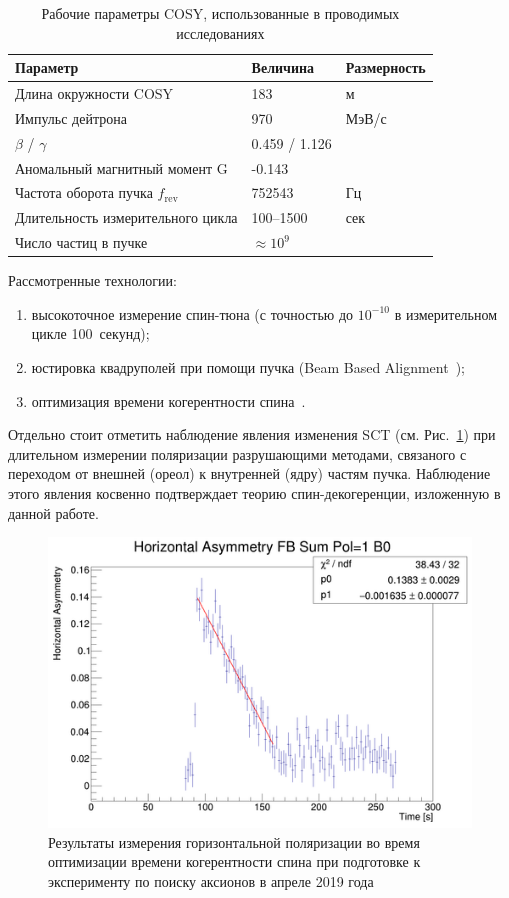 \begin{table}[H]\centering\captionsetup{width=.95\linewidth}
	\caption{Рабочие параметры COSY, использованные в проводимых исследованиях\label{tbl:COSY-studies}}
	\begin{tabular}{lll}
		\toprule
		Параметр & Величина & Размерность \\
		\midrule
		Длина окружности COSY& 183 & м\\
		Импульс дейтрона & 970 & МэВ/с \\
		$\beta$ / $\gamma$ & 0.459 / 1.126 & \\
		Аномальный магнитный момент G& -0.143& \\
		Частота оборота пучка $f_{\mathrm{rev}}$& 752543& Гц\\
		Длительность измерительного цикла& 100--1500& сек\\
		Число частиц в пучке & $\approx 10^9$& \\
		\bottomrule
	\end{tabular}
\end{table}

Рассмотренные технологии:
\begin{enumerate}[(1)]
	\item высокоточное измерение спин-тюна (с точностью до $10^{-10}$ в измерительном цикле 100~секунд);
	\item юстировка квадруполей при помощи пучка (Beam Based Alignment~\cite{Wagner:BBA2018});
	\item оптимизация времени когерентности спина~\cite{COSY:SCT:IPAC15, Guidoboni:STORI14}.
\end{enumerate} 

Отдельно стоит отметить наблюдение явления изменения SCT (см. Рис.~\ref{fig:April2019:Polarization}) 
при длительном измерении поляризации разрушающими методами, связаного с переходом 
от внешней (ореол) к внутренней (ядру) частям пучка. 
Наблюдение этого явления косвенно подтверждает теорию спин-декогеренции, изложенную в данной работе.

\begin{figure}[H]\centering
	\includegraphics[height=.3\paperheight]{images/chapter4/SCT-April-2019/11th_20-20}
\caption{Результаты измерения горизонтальной поляризации во время оптимизации времени когерентности спина при подготовке к эксперименту по поиску аксионов в апреле 2019 года\label{fig:April2019:Polarization}}
\end{figure}
